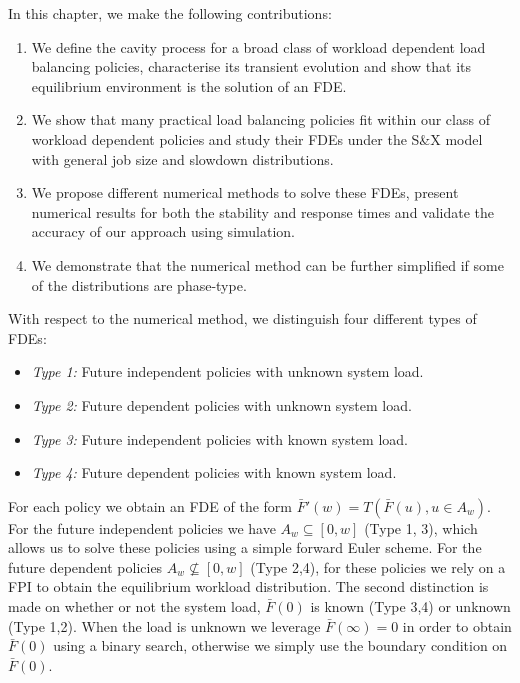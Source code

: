 \documentclass[12pt]{report}
\begin{document}
In this chapter, we make the following contributions:
\begin{enumerate}
	\item We define the cavity process for a broad class of workload dependent
	load balancing policies, characterise its transient evolution and show
	that its equilibrium environment is the solution of an FDE.
	\item We show that many practical load balancing policies fit within
	our class of workload dependent policies and study their FDEs
	under the S\&X model with general job size and slowdown distributions.
	\item We propose different numerical methods to solve these FDEs,
	present numerical results for both the stability and response times and 
	validate the accuracy of our approach using simulation. 
	\item We demonstrate that the numerical method can be further simplified
	if some of the distributions are phase-type.
\end{enumerate}


With respect to the numerical method, we distinguish four different types of FDEs:
\begin{itemize}[leftmargin=*]
	\item \textit{Type 1: } Future independent policies with unknown system load.
	\item \textit{Type 2: } Future dependent policies with unknown system load.
	\item \textit{Type 3: } Future independent policies with known system load.
	\item \textit{Type 4: } Future dependent policies with known system load.
\end{itemize}
For each policy we obtain an FDE of the form $\bar F'(w) = T(\bar F(u), u \in A_w)$. For the future independent policies we have $A_w \subseteq [0,w]$ (Type 1, 3), which allows us to solve these policies 
using a simple forward Euler scheme. For the future dependent policies $A_w  \not \subseteq [0,w]$ (Type 2,4), for these policies we rely on a FPI to obtain the equilibrium workload distribution. The second distinction is made on whether or not the system load, $\bar F(0)$ is known (Type 3,4) or unknown (Type 1,2). When the load is unknown we leverage $\bar F(\infty) = 0$ in order to obtain $\bar F(0)$ using a binary search, otherwise we simply use the boundary condition on $\bar F(0)$.
\end{document}
